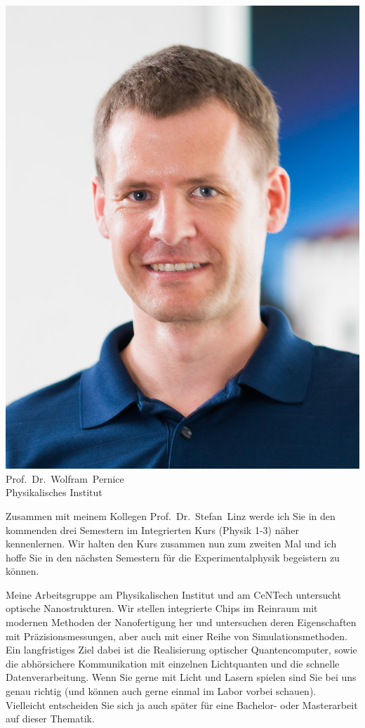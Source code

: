 \begin{multicols}{2}
\begin{center}
\includegraphics[width=0.9\columnwidth]{res/vorstellungsfotos/wolfram_pernice.jpg}\\
\smallskip
Prof.\ Dr.\ Wolfram\ Pernice\\
Physikalisches Institut
\end{center}

Zusammen mit meinem Kollegen Prof.\ Dr.\ Stefan\ Linz werde ich Sie in den kommenden drei Semestern im Integrierten Kurs (Physik 1-3) näher kennenlernen. Wir halten den Kurs zusammen nun zum zweiten Mal und ich hoffe Sie in den nächsten Semestern für die Experimentalphysik begeistern zu können.

Meine Arbeitsgruppe am Physikalischen Institut und am CeNTech untersucht optische Nanostrukturen. Wir stellen integrierte Chips im Reinraum mit modernen Methoden der Nanofertigung her und untersuchen deren Eigenschaften mit Präzisionsmessungen, aber auch mit einer Reihe von Simulationsmethoden. Ein langfristiges Ziel dabei ist die Realisierung optischer Quantencomputer, sowie die abhörsichere Kommunikation mit einzelnen Lichtquanten und die schnelle Datenverarbeitung. Wenn Sie gerne mit Licht und Lasern spielen sind Sie bei uns genau richtig (und können auch gerne einmal im Labor vorbei schauen). Vielleicht entscheiden Sie sich ja auch später für eine Bachelor- oder Masterarbeit auf dieser Thematik.


\end{multicols}
